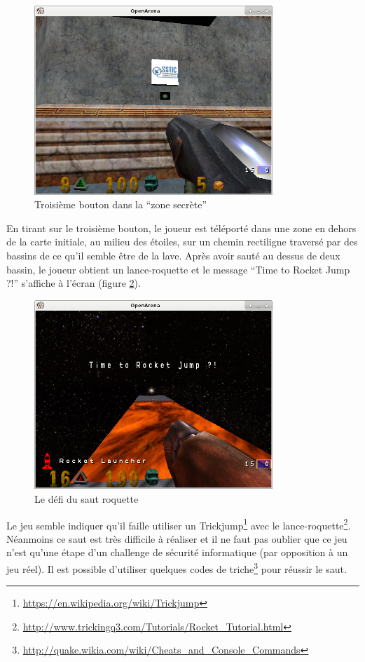 \documentclass[a4paper,10pt]{article}
\begin{document}
\begin{figure}[ht]
  \centering
  \includegraphics[width=9cm]{stage2/oashot-secretbutton.png}
  \caption{Troisième bouton dans la ``zone secrète''}
  \label{shot2-secretbutton}
\end{figure}

En tirant sur le troisième bouton, le joueur est téléporté dans une zone en dehors de la carte initiale, au milieu des étoiles, sur un chemin rectiligne traversé par des bassins de ce qu'il semble être de la lave.
Après avoir sauté au dessus de deux bassin, le joueur obtient un lance-roquette et le message ``Time to Rocket Jump ?!'' s'affiche à l'écran (figure \ref{shot2-rocketjump}).

\begin{figure}[ht]
  \centering
  \includegraphics[width=9cm]{stage2/oashot-rocketjump.png}
  \caption{Le défi du saut roquette}
  \label{shot2-rocketjump}
\end{figure}

Le jeu semble indiquer qu'il faille utiliser un Trickjump\footnote{\url{https://en.wikipedia.org/wiki/Trickjump}} avec le lance-roquette\footnote{\url{http://www.trickingq3.com/Tutorials/Rocket_Tutorial.html}}.
Néanmoins ce saut est très difficile à réaliser et il ne faut pas oublier que ce jeu n'est qu'une étape d'un challenge de sécurité informatique (par opposition à un jeu réel).
Il est possible d'utiliser quelques codes de triche\footnote{\url{http://quake.wikia.com/wiki/Cheats_and_Console_Commands}} pour réussir le saut.
\end{document}
